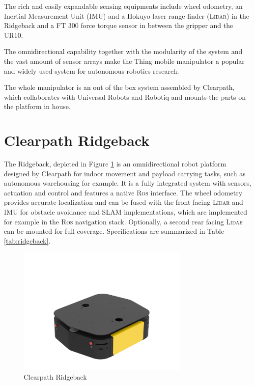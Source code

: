 The rich and easily expandable sensing equipments include wheel odometry, an Inertial Measurement Unit (IMU) and a Hokuyo laser range finder (\textsc{Lidar}) \citep{hokuyo} in the Ridgeback and a FT 300 force torque sensor \citep{robotiqFT300} in between the gripper and the UR10.

The omnidirectional capability together with the modularity of the system and the vast amount of sensor arrays make the Thing mobile manipulator a popular and widely used system for autonomous robotics research.

The whole manipulator is an out of the box system assembled by Clearpath, which collaborates with Universal Robots and Robotiq and mounts the parts on the platform in house.

\section{Clearpath Ridgeback}
	\label{sec:ridgeback}
The Ridgeback, depicted in Figure \ref{pics:ridgeback} is an omnidirectional robot platform designed by Clearpath for indoor movement and payload carrying tasks, such as autonomous warehousing for example. It is a fully integrated system with sensors, actuation and control and features a native \textsc{Ros} interface. The wheel odometry provides accurate localization and can be fused with the front facing \textsc{Lidar} and IMU for obstacle avoidance and SLAM implementations, which are implemented for example in the \textsc{Ros} navigation stack. Optionally, a second rear facing \textsc{Lidar} can be mounted for full \unit[360]{\textdegree} coverage. Specifications are summarized in Table \ref{tab:ridgeback}.

\begin{figure}[h]
   \centering
   \includegraphics[width=0.75\textwidth]{images/ridgeback.png}
   \caption{Clearpath Ridgeback}
   \label{pics:ridgeback}
\end{figure}

